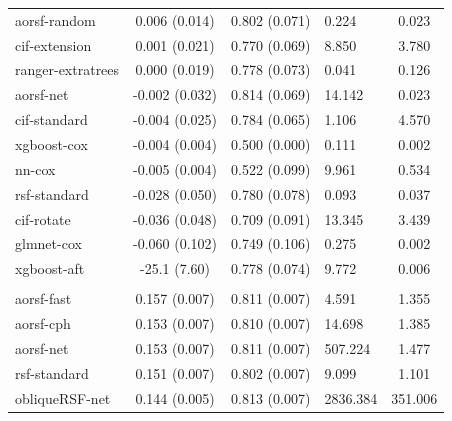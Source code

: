 \documentclass[twoside,11pt]{article}\usepackage[]{graphicx}\usepackage[]{xcolor}
\newenvironment{knitrout}{}{} %
\begin{document}
\begin{knitrout}
\begin{longtable}[t]{lcclc}
\hspace{1em}aorsf-random & 0.006 (0.014) & 0.802 (0.071) & 0.224 & 0.023\\
\hspace{1em}cif-extension & 0.001 (0.021) & 0.770 (0.069) & 8.850 & 3.780\\
\hspace{1em}ranger-extratrees & 0.000 (0.019) & 0.778 (0.073) & 0.041 & 0.126\\
\hspace{1em}aorsf-net & -0.002 (0.032) & 0.814 (0.069) & 14.142 & 0.023\\
\hspace{1em}cif-standard & -0.004 (0.025) & 0.784 (0.065) & 1.106 & 4.570\\
\hspace{1em}xgboost-cox & -0.004 (0.004) & 0.500 (0.000) & 0.111 & 0.002\\
\hspace{1em}nn-cox & -0.005 (0.004) & 0.522 (0.099) & 9.961 & 0.534\\
\hspace{1em}rsf-standard & -0.028 (0.050) & 0.780 (0.078) & 0.093 & 0.037\\
\hspace{1em}cif-rotate & -0.036 (0.048) & 0.709 (0.091) & 13.345 & 3.439\\
\hspace{1em}glmnet-cox & -0.060 (0.102) & 0.749 (0.106) & 0.275 & 0.002\\
\hspace{1em}xgboost-aft & -25.1 (7.60) & 0.778 (0.074) & 9.772 & 0.006\\
\addlinespace[0.3em]
\hline
\multicolumn{5}{l}{\textit{\textbf{ARIC; coronary heart disease, n = 13623, p = 41}}}\\
\hline
\hspace{1em}aorsf-fast & 0.157 (0.007) & 0.811 (0.007) & 4.591 & 1.355\\
\hspace{1em}aorsf-cph & 0.153 (0.007) & 0.810 (0.007) & 14.698 & 1.385\\
\hspace{1em}aorsf-net & 0.153 (0.007) & 0.811 (0.007) & 507.224 & 1.477\\
\hspace{1em}rsf-standard & 0.151 (0.007) & 0.802 (0.007) & 9.099 & 1.101\\
\hspace{1em}obliqueRSF-net & 0.144 (0.005) & 0.813 (0.007) & 2836.384 & 351.006\\

\end{longtable}
\end{knitrout}
\end{document}
